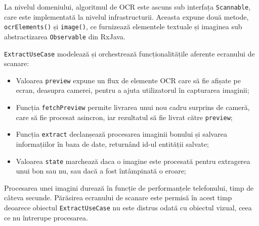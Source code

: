 La nivelul domeniului, algoritmul de OCR este ascuns sub interfața \texttt{Scannable}, care este implementată la nivelul infrastructurii. Aceasta expune două metode, \texttt{ocrElements()} și \texttt{image()}, ce furnizează elementele textuale și imaginea sub abstractizarea \texttt{Observable} din RxJava.



\texttt{ExtractUseCase} modelează și orchestrează funcționalitățile aferente ecranului de scanare:

\begin{itemize}
  \item 
  Valoarea \texttt{preview} expune un flux de elemente OCR care să fie afișate pe ecran, deasupra camerei, pentru a ajuta utilizatorul în capturarea imaginii;

  \item
  Funcția \texttt{fetchPreview} permite livrarea unui nou cadru surprins de cameră, care să fie procesat asincron, iar rezultatul să fie livrat către \texttt{preview};

  \item
  Funcția \texttt{extract} declanșează procesarea imaginii bonului și salvarea informațiilor în baza de date, returnând id-ul entității salvate;

  \item
  Valoarea \texttt{state} marchează daca o imagine este procesată pentru extragerea unui bon sau nu, sau dacă a fost întâmpinată o eroare;
\end{itemize}

Procesarea unei imagini durează în funcție de performanțele telefonului, timp de câteva secunde. Părăsirea ecranului de scanare este permisă în acest timp deoarece obiectul \texttt{ExtractUseCase} nu este distrus odată cu obiectul vizual, ceea ce nu întrerupe procesarea.
